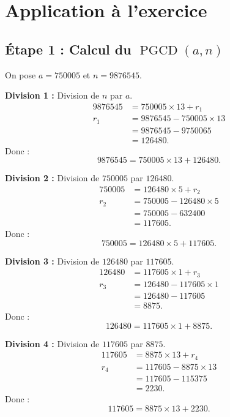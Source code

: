\documentclass[12pt,a4paper]{article}
\begin{document}
\section*{Application à l'exercice}

\subsection*{Étape 1 : Calcul du $\operatorname{PGCD}(a, n)$}

On pose $a = 750005$ et $n = 9876545$.

\medskip
\noindent
\textbf{Division 1 :} Division de $n$ par $a$.
\[
\begin{aligned}
9876545 &= 750005 \times 13 + r_1 \\
r_1    &= 9876545 - 750005 \times 13 \\
       &= 9876545 - 9750065 \\
       &= 126480.
\end{aligned}
\]
Donc :
\[
\boxed{9876545 = 750005 \times 13 + 126480}.
\]

\noindent
\textbf{Division 2 :} Division de $750005$ par $126480$.
\[
\begin{aligned}
750005 &= 126480 \times 5 + r_2 \\
r_2    &= 750005 - 126480 \times 5 \\
       &= 750005 - 632400 \\
       &= 117605.
\end{aligned}
\]
Donc :
\[
\boxed{750005 = 126480 \times 5 + 117605}.
\]

\noindent
\textbf{Division 3 :} Division de $126480$ par $117605$.
\[
\begin{aligned}
126480 &= 117605 \times 1 + r_3 \\
r_3    &= 126480 - 117605 \times 1 \\
       &= 126480 - 117605 \\
       &= 8875.
\end{aligned}
\]
Donc :
\[
\boxed{126480 = 117605 \times 1 + 8875}.
\]

\noindent
\textbf{Division 4 :} Division de $117605$ par $8875$.
\[
\begin{aligned}
117605 &= 8875 \times 13 + r_4 \\
r_4    &= 117605 - 8875 \times 13 \\
       &= 117605 - 115375 \\
       &= 2230.
\end{aligned}
\]
Donc :
\[
\boxed{117605 = 8875 \times 13 + 2230}.
\]
\end{document}
